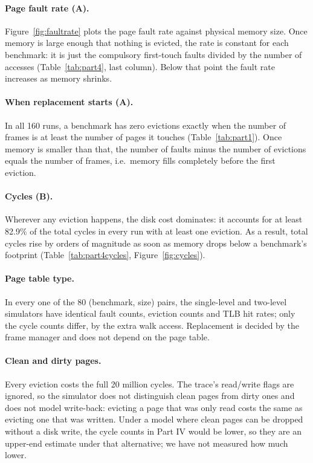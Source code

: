 \documentclass[11pt,a4paper]{article}
\begin{document}
\paragraph{Page fault rate (A).} Figure~\ref{fig:faultrate} plots the page fault rate against physical memory size. Once memory is large enough that nothing is evicted, the rate is constant for each benchmark: it is just the compulsory first-touch faults divided by the number of accesses (Table~\ref{tab:part4}, last column). Below that point the fault rate increases as memory shrinks.

\paragraph{When replacement starts (A).} In all 160 runs, a benchmark has zero evictions exactly when the number of frames is at least the number of pages it touches (Table~\ref{tab:part1}). Once memory is smaller than that, the number of faults minus the number of evictions equals the number of frames, i.e.\ memory fills completely before the first eviction.

\paragraph{Cycles (B).} Wherever any eviction happens, the disk cost dominates: it accounts for at least 82.9\% of the total cycles in every run with at least one eviction. As a result, total cycles rise by orders of magnitude as soon as memory drops below a benchmark's footprint (Table~\ref{tab:part4cycles}, Figure~\ref{fig:cycles}).

\paragraph{Page table type.} In every one of the 80 (benchmark, size) pairs, the single-level and two-level simulators have identical fault counts, eviction counts and TLB hit rates; only the cycle counts differ, by the extra walk access. Replacement is decided by the frame manager and does not depend on the page table.

\paragraph{Clean and dirty pages.} Every eviction costs the full 20 million cycles. The trace's read/write flags are ignored, so the simulator does not distinguish clean pages from dirty ones and does not model write-back: evicting a page that was only read costs the same as evicting one that was written. Under a model where clean pages can be dropped without a disk write, the cycle counts in Part IV would be lower, so they are an upper-end estimate under that alternative; we have not measured how much lower.
\end{document}
